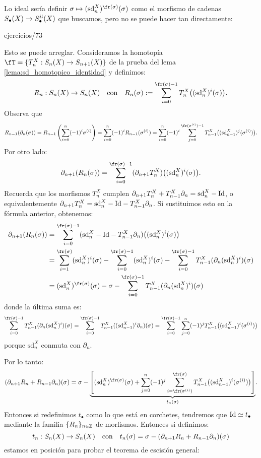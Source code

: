 \documentclass[../../topologia_algebraica]{subfiles}
\begin{document}
Lo ideal ser\'ia definir $\sigma\mapsto (\text{sd}^X_n)^{\fr(\sigma)}(\sigma)$ como
el morfismo de cadenas $S_{\bullet}(X)\rightarrow S_{\bullet}^{\mathfrak{U}}(X)$ que buscamos, pero no
se puede hacer tan directamente:

{ejercicios/73} %

Esto se puede arreglar. Consideramos la homotop\'ia $\fT=\{T^X_n:S_n(X)\ra S_{n+1}(X)\}$
de la prueba del lema \ref{lema:sd_homotopico_identidad} y definimos:
\[
  R_n:S_n(X)\ra S_n(X) \quad\text{con}\quad
  R_n(\sigma):=\sum_{i=0}^{\fr(\sigma)-1}T_n^X\big((\text{sd}^X_n)^i(\sigma)\big).
\]
Observa que
\[
  R_{n-1}(\partial_n(\sigma))=
  R_{n-1}\paren{\sum_{i=0}^n(-1)^i\sigma^{(i)}}=
  \sum_{i=0}^n(-1)^iR_{n-1}(\sigma^{(i)})=
  \sum_{i=0}^n(-1)^i\sum_{j=0}^{\fr(\sigma^{(i)})-1}T_{n-1}^X\big((\text{sd}^X_{n-1})^j(\sigma^{(i)})\big).
\]
Por otro lado:
\[
  \partial_{n+1}(R_n(\sigma))=
  \sum_{i=0}^{\fr(\sigma)-1}(\partial_{n+1}T_n^X)\big((\text{sd}^X_n)^i(\sigma)\big).
\]
Recuerda que los morfismos $T^X_n$ cumplen $\partial_{n+1}T^X_n+T^X_{n-1}\partial_n=\text{sd}^X_n-\text{Id}$,
o equivalentemente $\partial_{n+1}T^X_n=\text{sd}^X_n-\text{Id}-T^X_{n-1}\partial_n$. Si sustituimos
esto en la f\'ormula anterior, obtenemos:
\begin{align*}
  \partial_{n+1}(R_n(\sigma)) & =
  \sum_{i=0}^{\fr(\sigma)-1}%
  (\text{sd}^X_n-\Id-T^X_{n-1}\partial_n)\big((\text{sd}^X_n)^i(\sigma)\big)\\ & =
  \sum_{i=1}^{\fr(\sigma)}(\text{sd}^X_n)^i(\sigma)-\sum_{i=0}^{\fr(\sigma)-1}(\text{sd}^X_n)^i(\sigma)-
  \sum_{i=0}^{\fr(\sigma)-1}T^X_{n-1}(\partial_n(\text{sd}^X_n)^i)(\sigma)\\ & =
  (\text{sd}^X_n)^{\fr(\sigma)}(\sigma)-\sigma-
  \sum_{i=0}^{\fr(\sigma)-1}T^X_{n-1}(\partial_n(\text{sd}^X_n)^i)(\sigma)
\end{align*}
donde la \'ultima suma es:
\[
  \sum_{i=0}^{\fr(\sigma)-1}T^X_{n-1}(\partial_n(\text{sd}^X_n)^i)(\sigma)=
  \sum_{i=0}^{\fr(\sigma)-1}T^X_{n-1}((\text{sd}^X_{n-1})^i\partial_n)(\sigma)=
  \sum_{i=0}^{\fr(\sigma)-1}\sum_{j=0}^n(-1)^j T^X_{n-1}\big((\text{sd}^X_{n-1})^i(\sigma^{(i)})\big)
\]
porque $\text{sd}^X_n$ conmuta con $\partial_n$.

Por lo tanto:
\begin{equation}\label{eq:homotopia_final}
  (\partial_{n+1}R_n+R_{n-1}\partial_n)(\sigma)=
  \sigma-\underset{t_n(\sigma)}{\underbrace{\left[(\text{sd}^X_n)^{\fr(\sigma)}(\sigma)+
    \sum_{j=0}^n(-1)^j\sum_{i=\fr(\sigma^{(i)})}^{\fr(\sigma)}%
    T^X_{n-1}\big((\text{sd}^X_{n-1})^i(\sigma^{(i)})\big)\right]}}.
\end{equation}
Entonces si redefinimos $t_{\bullet}$ como lo que est\'a en corchetes, tendremos que
$\text{Id}\simeq t_{\bullet}$ mediante la familia $\{R_n\}_{n\in\mathbb{Z}}$ de morfismos. Entonces
si definimos:
\[
  t_n:S_n(X)\rightarrow S_n(X)\quad\text{con}\quad
  t_n(\sigma)=\sigma-(\partial_{n+1}R_n+R_{n-1}\partial_n)(\sigma)
\]
estamos en posici\'on para probar el teorema de escisi\'on general:
\end{document}
